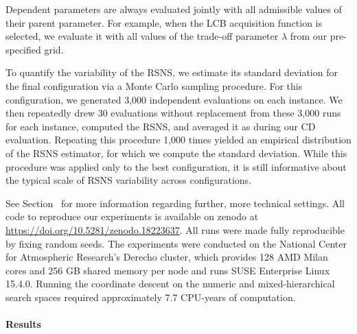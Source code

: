 \documentclass[12pt,letterpaper]{article}
\begin{document}
Dependent parameters are always evaluated jointly with all admissible values of their parent parameter.
For example, when the LCB acquisition function is selected, we evaluate it with all values of the trade-off parameter $\lambda$ from our pre-specified grid.

To quantify the variability of the RSNS, we estimate its standard deviation for the final configuration via a Monte Carlo sampling procedure.
For this configuration, we generated 3{,}000 independent evaluations on each instance.
We then repeatedly drew 30 evaluations without replacement from these 3{,}000 runs for each instance, computed the RSNS, and averaged it as during our CD evaluation.
Repeating this procedure 1{,}000 times yielded an empirical distribution of the RSNS estimator, for which we compute the standard deviation.
While this procedure was applied only to the best configuration, it is still informative about the typical scale of RSNS variability across configurations.

See Section~ for more information regarding further, more technical settings.
All code to reproduce our experiments is available on zenodo at \url{https://doi.org/10.5281/zenodo.18223637}. 
All runs were made fully reproducible by fixing random seeds.
The experiments were conducted on the National Center for Atmospheric Research's Derecho cluster\cite{derecho2023}, which provides 128 AMD Milan cores and 256 GB shared memory per node and runs SUSE Enterprise Linux 15.4.0.
Running the coordinate descent on the numeric and mixed-hierarchical search spaces required approximately 7.7 CPU-years of computation.

\paragraph{Results}
\end{document}
